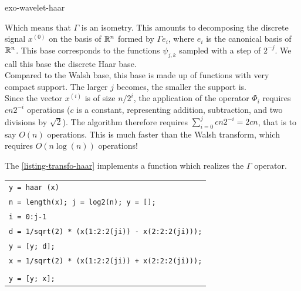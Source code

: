 \begin{correction}{exo-wavelet-haar}
\begin{enumerate}
Which means that $ \Gamma $ is an isometry. This amounts to decomposing the discrete signal $ x^{(0)} $ on the basis of $ \mathbb{R}^n $ formed by $ \Gamma e_i $, where $ e_i $ is the canonical basis of $ \mathbb{R}^n $. This base corresponds to the functions $ \psi_{j, k} $ sampled with a step of $ 2^{- j} $. We call this base the discrete Haar base. \\Compared to the Walsh base, this base is made up of functions with very compact support. The larger $ j $ becomes, the smaller the support is. \\Since the vector $ x^{(i)} $ is of size $ n/2^i $, the application of the operator $ \Phi_i $ requires $ cn 2^{- i} $ operations ($ c $ is a constant, representing addition, subtraction, and two divisions by $ \sqrt{2} $). The algorithm therefore requires $ \sum_{i = 0}^j{cn 2^{- i}} = 2 cn $, that is to say $ O(n) $ operations. This is much faster than the Walsh transform, which requires $ O(n \log (n)) $ operations!
\end{enumerate} The \listingterme{} \ref{listing-transfo-haar} implements a \Matlab{} function which realizes the $ \Gamma $ operator.
 
\begin{listing} \begin{footnotesize}
{\upshape
\begin{tabular}{l} \texttt{\pfunction y = haar (x)} \\
\texttt{n = length(x); j = log2(n); y = [];} \\
\texttt{\pfor i = 0:j-1} \\
\texttt{\quad d = 1/sqrt(2) * (x(1:2:2{\hatverb}(ji)) - x(2:2:2{\hatverb}(ji)));} \\
\texttt{\quad y = [y; d];} \\
\texttt{\quad x = 1/sqrt(2) * (x(1:2:2{\hatverb}(ji)) + x(2:2:2{\hatverb}(ji)));} \\
\texttt{\pend} \\
\texttt{y = [y; x];} \\
\end{tabular}
}
\end{footnotesize}
\caption{Procedure \texttt{\upshape haar}}
\label{listing-transfo-haar}
\end{listing}
\end{correction}
 
